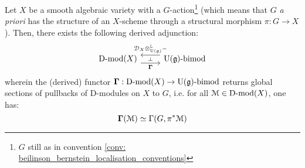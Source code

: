                 \begin{theorem} \label{theorem: localisation_adjunction_for_D_modules}
                    Let $X$ be a smooth algebraic variety with a $G$-action\footnote{$G$ still as in convention \ref{conv: beilinson_bernstein_localisation_conventions}} (which means that $G$ \textit{a priori} has the structure of an $X$-scheme through a structural morphism $\pi: G \to X$). Then, there exists the following derived adjunction:
                        $$
                            \begin{tikzcd}
                            	{\Dmod(X)} & {\U(\g)\bimod}
                            	\arrow[""{name=0, anchor=center, inner sep=0}, "{\bfGamma}"', shift right=2, from=1-1, to=1-2]
                            	\arrow[""{name=1, anchor=center, inner sep=0}, "{\D_X \tensor^{\L}_{\U(\g)} -}"', shift right=2, from=1-2, to=1-1]
                            	\arrow["\dashv"{anchor=center, rotate=-90}, draw=none, from=1, to=0]
                            \end{tikzcd}
                        $$
                    wherein the (derived) functor $\mathbf{\Gamma}: \mathrm{D}\text{-}\mathrm{mod}(X) \to \mathrm{U}(\mathfrak{g})\text{-}\mathrm{bimod}$ returns global sections of pullbacks of D-modules on $X$ to $G$, i.e. for all $\mathcal{M} \in \mathrm{D}\text{-}\mathrm{mod}(X)$, one has:
                        $$\mathbf{\Gamma}(\mathcal{M}) \simeq \Gamma(G, \pi^*\mathcal{M})$$
                \end{theorem}

